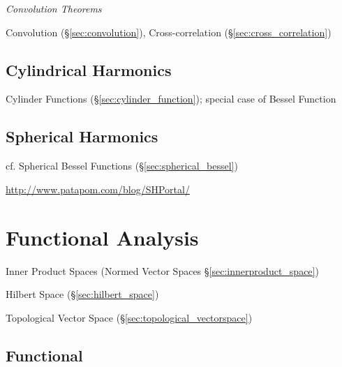 \emph{Convolution Theorems}

Convolution (\S\ref{sec:convolution}), Cross-correlation
(\S\ref{sec:cross_correlation})



\subsection{Cylindrical Harmonics}\label{sec:cylindrical_harmonics}

\fist Cylinder Functions (\S\ref{sec:cylinder_function}); special case of Bessel
Function



\subsection{Spherical Harmonics}\label{sec:spherical_harmonics}

\fist cf. Spherical Bessel Functions (\S\ref{sec:spherical_bessel})

\url{http://www.patapom.com/blog/SHPortal/}



\section{Functional Analysis}\label{sec:functional_analysis}

Inner Product Spaces (Normed Vector Spaces
\S\ref{sec:innerproduct_space})

Hilbert Space (\S\ref{sec:hilbert_space})

Topological Vector Space (\S\ref{sec:topological_vectorspace})



\subsection{Functional}\label{sec:functional}

